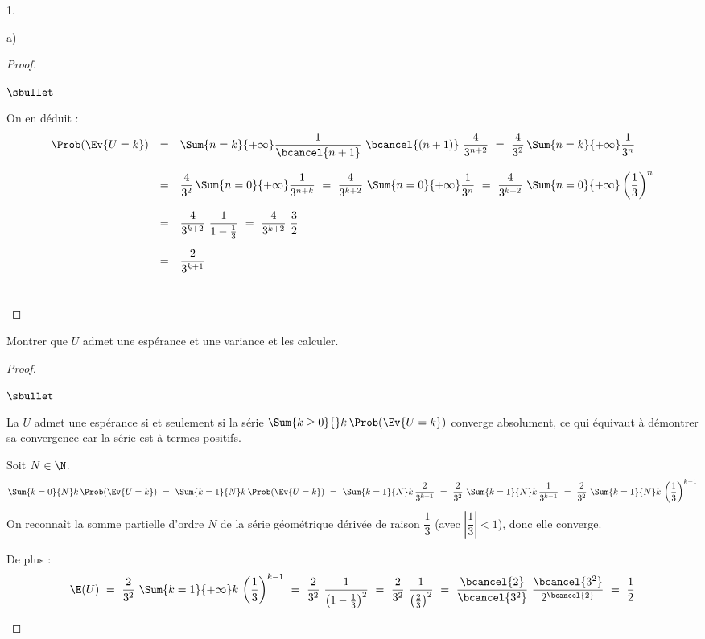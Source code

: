 \documentclass[11pt]{article}%
\begin{document}
\begin{noliste}{1.}
\begin{noliste}{a)}
\begin{proof}
\begin{noliste}{$\sbullet$}
      
      On en déduit :
      \[
       \begin{array}{rcl}
        \Prob(\Ev{U=k}) & = &  \Sum{n=k}{+\infty} \dfrac{1}{\bcancel{n+1}}
        \ \bcancel{(n+1)} \ \dfrac{4}{3^{n+2}}
        \ = \ \dfrac{4}{3^2} \, \Sum{n=k}{+\infty} \dfrac{1}{3^n}
        \\[.6cm]
        & = &  \dfrac{4}{3^2} \, \Sum{n=0}{+\infty} \dfrac{1}{3^{n+k}}
        \ = \ \dfrac{4}{3^{k+2}} \ \Sum{n=0}{+\infty}
        \dfrac{1}{3^n}
        \ = \ \dfrac{4}{3^{k+2}} \ \Sum{n=0}{+\infty} \left(
        \dfrac{1}{3}\right)^n
        \\[.6cm]
        & = &  \dfrac{4}{3^{k+2}} \ \dfrac{1}{1- \frac{1}{3}} \ = \
        \dfrac{4}{3^{k+2}} \ \dfrac{3}{2}
        \\[.6cm]
        & = &  \dfrac{2}{3^{k+1}}
       \end{array}
      \]
      ~\\[-1.2cm]
     \end{noliste}
    \end{proof}
    
    \item Montrer que $U$ admet une espérance et une variance et les 
    calculer.
    
    \begin{proof}~
      \begin{noliste}{$\sbullet$}
	\item La \var $U$ admet une espérance si et seulement si la 
	série $\Sum{k\geq 0}{} k \, \Prob(\Ev{U=k})$ converge 
	absolument,
	ce qui équivaut à démontrer sa convergence car la série est 
	à termes positifs.
	
	\item Soit $N\in \N$.
	\[
	  \Sum{k=0}{N} k \, \Prob(\Ev{U=k}) \ = \
	  \Sum{k=1}{N} k \, \Prob(\Ev{U=k}) \ = \
	  \Sum{k=1}{N} k \, \dfrac{2}{3^{k+1}} \ = \
	  \dfrac{2}{3^2} \ \Sum{k=1}{N} k \, \dfrac{1}{3^{k-1}} \ = \
	  \dfrac{2}{3^2} \ \Sum{k=1}{N} k \, \left( \dfrac{1}{3}
	  \right)^{k-1}
	\]
	On reconnaît la somme partielle d'ordre $N$ de la série 
	géométrique dérivée de raison $\dfrac{1}{3}$ (avec $\left\vert 
	\dfrac{1}{3} \right\vert <1$), donc elle converge.
	
	De plus :
	\[
	  \E(U) \ = \
	  \dfrac{2}{3^2} \ \Sum{k=1}{+\infty} k \, \left(\dfrac{1}{3}
	  \right)^{k-1} 
	  \ = \ \dfrac{2}{3^2} \ \dfrac{1}{\big(1-\frac{1}{3}\big)^2}
	  \ = \ \dfrac{2}{3^2} \ \dfrac{1}{\big( \frac{2}{3}\big)^2}
	  \ = \ \dfrac{\bcancel{2}}{\bcancel{3^2}} \ 
	  \dfrac{\bcancel{3^2}}{2^{\bcancel{2}}} \ = \ \dfrac{1}{2}
	\]
	\conc{$\E(U) = \dfrac{1}{2}$}
	

\end{noliste}
\end{proof}
\end{noliste}
\end{noliste}
\end{document}
